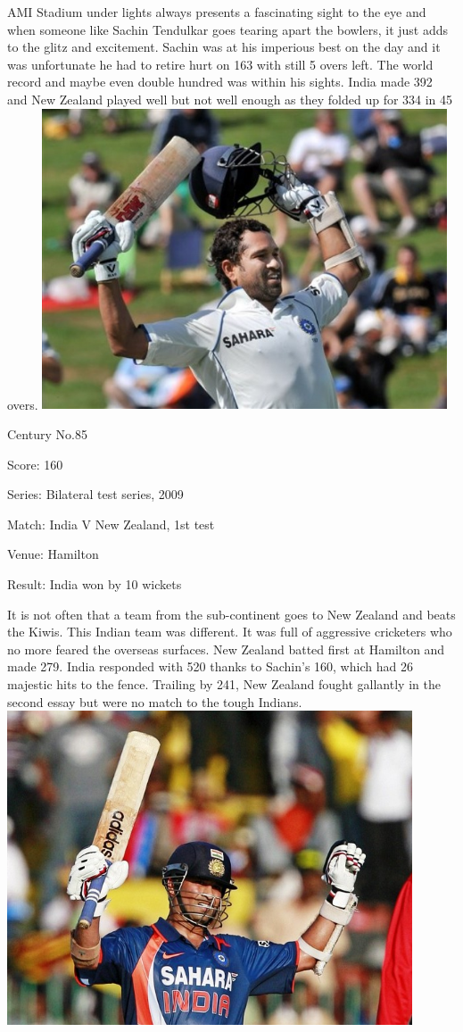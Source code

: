 \documentclass[11pt, a4paper]{article}
\begin{document}
AMI Stadium under lights always presents a fascinating sight to the eye and when someone like Sachin Tendulkar goes tearing apart the bowlers, it just adds to the glitz and excitement. Sachin was at his imperious best on the day and it was unfortunate he had to retire hurt on 163 with still 5 overs left. The world record and maybe even double hundred was within his sights. India made 392 and New Zealand played well but not well enough as they folded up for 334 in 45 overs.
\newpage
\includegraphics[width=0.9\textwidth]{pics/85.jpg}

Century No.85 

Score: 160 

Series: Bilateral test series, 2009 

Match: India V New Zealand, 1st test 

Venue: Hamilton 

Result: India won by 10 wickets 

It is not often that a team from the sub-continent goes to New Zealand and beats the Kiwis. This Indian team was different. It was full of aggressive cricketers who no more feared the overseas surfaces. New Zealand batted first at Hamilton and made 279. India responded with 520 thanks to Sachin's 160, which had 26 majestic hits to the fence. Trailing by 241, New Zealand fought gallantly in the second essay but were no match to the tough Indians.
\newpage
\includegraphics[width=0.9\textwidth]{pics/86.jpg}
\end{document}
